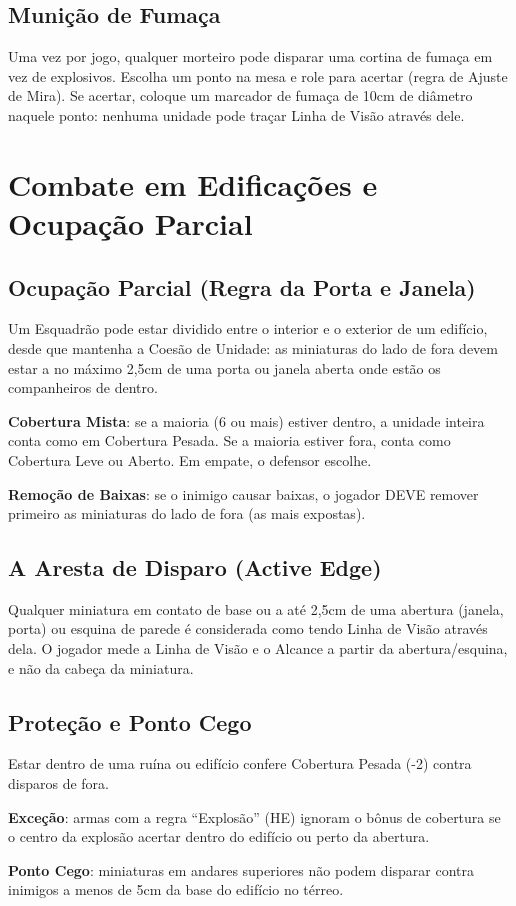 \subsection{Munição de Fumaça}

Uma vez por jogo, qualquer morteiro pode disparar uma cortina de fumaça em vez de explosivos. Escolha um ponto na mesa e role para acertar (regra de Ajuste de Mira). Se acertar, coloque um marcador de fumaça de 10cm de diâmetro naquele ponto: nenhuma unidade pode traçar Linha de Visão através dele.

\section{Combate em Edificações e Ocupação Parcial}

\subsection{Ocupação Parcial (Regra da Porta e Janela)}

Um Esquadrão pode estar dividido entre o interior e o exterior de um edifício, desde que mantenha a Coesão de Unidade: as miniaturas do lado de fora devem estar a no máximo 2,5cm de uma porta ou janela aberta onde estão os companheiros de dentro.

\textbf{Cobertura Mista}: se a maioria (6 ou mais) estiver dentro, a unidade inteira conta como em Cobertura Pesada. Se a maioria estiver fora, conta como Cobertura Leve ou Aberto. Em empate, o defensor escolhe.

\textbf{Remoção de Baixas}: se o inimigo causar baixas, o jogador DEVE remover primeiro as miniaturas do lado de fora (as mais expostas).

\subsection{A Aresta de Disparo (Active Edge)}

Qualquer miniatura em contato de base ou a até 2,5cm de uma abertura (janela, porta) ou esquina de parede é considerada como tendo Linha de Visão através dela. O jogador mede a Linha de Visão e o Alcance a partir da abertura/esquina, e não da cabeça da miniatura.

\subsection{Proteção e Ponto Cego}

Estar dentro de uma ruína ou edifício confere Cobertura Pesada (-2) contra disparos de fora.

\textbf{Exceção}: armas com a regra ``Explosão'' (HE) ignoram o bônus de cobertura se o centro da explosão acertar dentro do edifício ou perto da abertura.

\textbf{Ponto Cego}: miniaturas em andares superiores não podem disparar contra inimigos a menos de 5cm da base do edifício no térreo.
